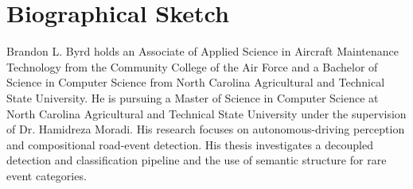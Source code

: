 \chapter*{Biographical Sketch}

Brandon L. Byrd holds an Associate of Applied Science in Aircraft Maintenance Technology from the Community College of the Air Force and a Bachelor of Science in Computer Science from North Carolina Agricultural and Technical State University. He is pursuing a Master of Science in Computer Science at North Carolina Agricultural and Technical State University under the supervision of Dr. Hamidreza Moradi. His research focuses on autonomous-driving perception and compositional road-event detection. His thesis investigates a decoupled detection and classification pipeline and the use of semantic structure for rare event categories.
